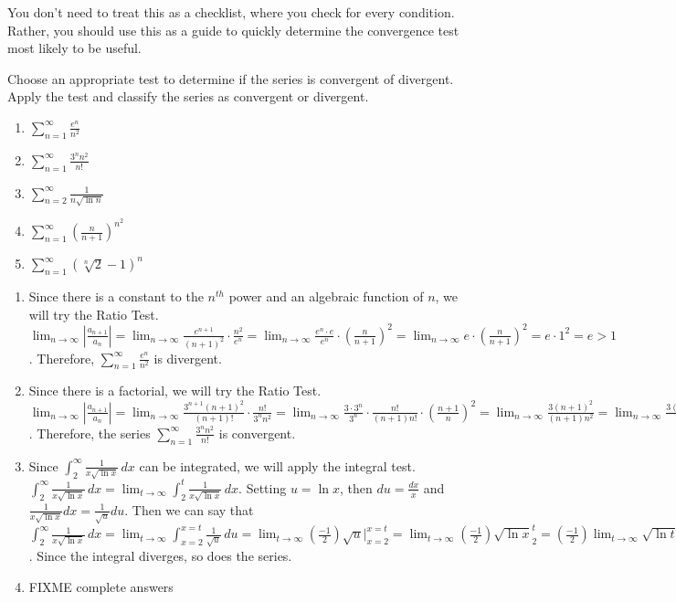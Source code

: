 You don't need to treat this as a checklist, where you check for every 
condition. Rather, you should use this as a guide to quickly determine the 
convergence test most likely to be useful. 

\begin{Exercise}[label = test]
Choose an appropriate test to determine if the series is convergent of 
divergent. Apply the test and classify the series as convergent or divergent.
\begin{enumerate}
\item $\sum_{n=1}^\infty \frac{e^n}{n^2}$
\item $\sum_{n=1}^\infty \frac{3^n n^2}{n!}$
\item $\sum_{n=2}^\infty \frac{1}{n\sqrt{\ln{n}}}$
\item $\sum_{n=1}^\infty \left( \frac{n}{n+1} \right)^{n^2}$
\item $\sum_{n=1}^\infty \left( \sqrt[n]{2} - 1\right)^n$
\end{enumerate}
\end{Exercise}

\begin{Answer}[ref = test]
\begin{enumerate}
\item Since there is a constant to the $n^{th}$ power and an algebraic 
function of $n$, we will try the Ratio Test. $\lim_{n \to \infty} \left| 
\frac{a_{n+1}}{a_n} \right| = \lim_{n \to \infty} \frac{e^{n + 1}}{(n + 1)^2} 
\cdot \frac{n^2}{e^n} = \lim_{n \to \infty} \frac{e^n \cdot e}{e^n} \cdot 
\left( \frac{n}{n + 1} \right)^2 = \lim_{n \to \infty} e \cdot \left( 
\frac{n}{n + 1} \right)^2 = e \cdot 1^2 = e >1$. Therefore, $\sum_{n=1}^\infty 
\frac{e^n}{n^2}$ is divergent. 
\item Since there is a factorial, we will try the Ratio Test. $\lim_{n \to 
\infty} \left| \frac{a_{n+1}}{a_n} \right| = \lim_{n \to \infty} 
\frac{3^{n + 1}(n + 1)^2}{(n + 1)!} \cdot \frac{n!}{3^n n^2} = \lim_{n \to 
\infty} \frac{3 \cdot 3^n}{3^n} \cdot \frac{n!}{(n+1)n!} \cdot \left( 
\frac{n + 1}{n} \right)^2 = \lim_{n \to \infty} \frac{3(n+1)^2}{(n+1)n^2} = 
\lim_{n \to \infty} \frac{3(n+1)}{n^2} = 0 < 1$. Therefore, the series 
$\sum_{n=1}^\infty \frac{3^n n^2}{n!}$ is convergent. 
\item Since $\int_2^\infty \frac{1}{x\sqrt{\ln{x}}}\,dx$ can be integrated, we 
will apply the integral test. $\int_2^\infty \frac{1}{x\sqrt{\ln{x}}}\,dx = 
\lim_{t \to \infty} \int_2^t \frac{1}{x\sqrt{\ln{x}}}\,dx$. Setting $u = 
\ln{x}$, then $du = \frac{dx}{x}$ and $\frac{1}{x\sqrt{\ln{x}}}dx = 
\frac{1}{\sqrt{u}}du$. Then we can say that $\int_2^\infty \frac{1}{x\sqrt{\ln{
x}}}\,dx = \lim_{t \to \infty} \int_{x=2}^{x=t} \frac{1}{\sqrt{u}}\,du = 
\lim_{t \to \infty} \left( \frac{-1}{2} \right) \sqrt{u} |_{x=2}^{x=t} = 
\lim_{t \to \infty} \left( \frac{-1}{2} \right) \sqrt{\ln{x}}_{2}^{t} = \left( 
\frac{-1}{2} \right) \lim_{t \to \infty} \sqrt{\ln{t}} - \left( \frac{-1}{2} 
\right) \sqrt{\ln{2}} = \infty$. Since the integral diverges, so does the 
series. 
\item FIXME complete answers
\end{enumerate}
\end{Answer}




